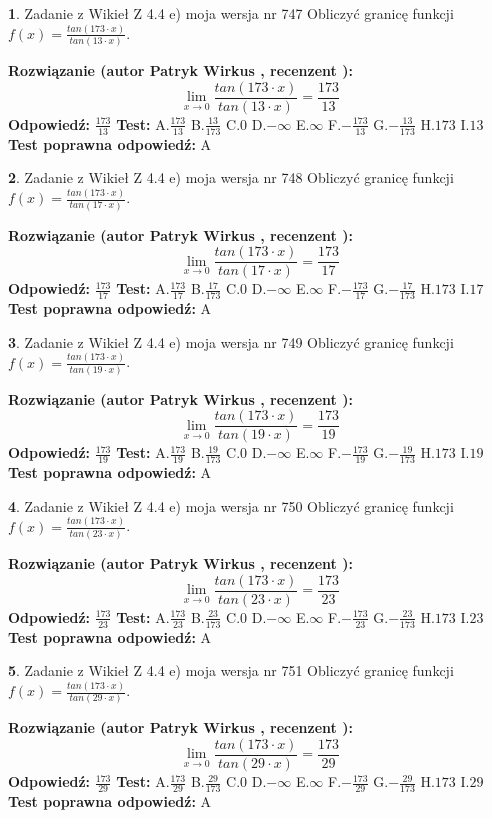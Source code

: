 \documentclass[12pt, a4paper]{article}
\theoremstyle{definition} %
\newtheorem{zad}{}
\newcommand{\zadStart}[1]{\begin{zad}#1\newline}
\newcommand{\zadStop}{\end{zad}}
\newcommand{\rozwStart}[2]{\noindent \textbf{Rozwiązanie (autor #1 , recenzent #2): }\newline}
\newcommand{\rozwStop}{\newline}
\newcommand{\odpStart}{\noindent \textbf{Odpowiedź:}\newline}
\newcommand{\odpStop}{\newline}
\newcommand{\testStart}{\noindent \textbf{Test:}\newline}
\newcommand{\testStop}{\newline}
\newcommand{\kluczStart}{\noindent \textbf{Test poprawna odpowiedź:}\newline}
\newcommand{\kluczStop}{\newline}
\begin{document}
\zadStart{Zadanie z Wikieł Z 4.4 e) moja wersja nr 747}
Obliczyć granicę funkcji $f(x)=\frac{tan(173\cdot x)}{tan(13\cdot x)}$.
\zadStop
\rozwStart{Patryk Wirkus}{}
$$\lim\limits_{x\to 0}\frac{tan(173\cdot x)}{tan(13\cdot x)}=
\frac{173}{13}$$
\rozwStop
\odpStart
$\frac{173}{13}$
\odpStop
\testStart
A.$\frac{173}{13}$
B.$\frac{13}{173}$
C.$0$
D.$-\infty$
E.$\infty$
F.$-\frac{173}{13}$
G.$-\frac{13}{173}$
H.$173$
I.$13$
\testStop
\kluczStart
A
\kluczStop



\zadStart{Zadanie z Wikieł Z 4.4 e) moja wersja nr 748}
Obliczyć granicę funkcji $f(x)=\frac{tan(173\cdot x)}{tan(17\cdot x)}$.
\zadStop
\rozwStart{Patryk Wirkus}{}
$$\lim\limits_{x\to 0}\frac{tan(173\cdot x)}{tan(17\cdot x)}=
\frac{173}{17}$$
\rozwStop
\odpStart
$\frac{173}{17}$
\odpStop
\testStart
A.$\frac{173}{17}$
B.$\frac{17}{173}$
C.$0$
D.$-\infty$
E.$\infty$
F.$-\frac{173}{17}$
G.$-\frac{17}{173}$
H.$173$
I.$17$
\testStop
\kluczStart
A
\kluczStop



\zadStart{Zadanie z Wikieł Z 4.4 e) moja wersja nr 749}
Obliczyć granicę funkcji $f(x)=\frac{tan(173\cdot x)}{tan(19\cdot x)}$.
\zadStop
\rozwStart{Patryk Wirkus}{}
$$\lim\limits_{x\to 0}\frac{tan(173\cdot x)}{tan(19\cdot x)}=
\frac{173}{19}$$
\rozwStop
\odpStart
$\frac{173}{19}$
\odpStop
\testStart
A.$\frac{173}{19}$
B.$\frac{19}{173}$
C.$0$
D.$-\infty$
E.$\infty$
F.$-\frac{173}{19}$
G.$-\frac{19}{173}$
H.$173$
I.$19$
\testStop
\kluczStart
A
\kluczStop



\zadStart{Zadanie z Wikieł Z 4.4 e) moja wersja nr 750}
Obliczyć granicę funkcji $f(x)=\frac{tan(173\cdot x)}{tan(23\cdot x)}$.
\zadStop
\rozwStart{Patryk Wirkus}{}
$$\lim\limits_{x\to 0}\frac{tan(173\cdot x)}{tan(23\cdot x)}=
\frac{173}{23}$$
\rozwStop
\odpStart
$\frac{173}{23}$
\odpStop
\testStart
A.$\frac{173}{23}$
B.$\frac{23}{173}$
C.$0$
D.$-\infty$
E.$\infty$
F.$-\frac{173}{23}$
G.$-\frac{23}{173}$
H.$173$
I.$23$
\testStop
\kluczStart
A
\kluczStop



\zadStart{Zadanie z Wikieł Z 4.4 e) moja wersja nr 751}
Obliczyć granicę funkcji $f(x)=\frac{tan(173\cdot x)}{tan(29\cdot x)}$.
\zadStop
\rozwStart{Patryk Wirkus}{}
$$\lim\limits_{x\to 0}\frac{tan(173\cdot x)}{tan(29\cdot x)}=
\frac{173}{29}$$
\rozwStop
\odpStart
$\frac{173}{29}$
\odpStop
\testStart
A.$\frac{173}{29}$
B.$\frac{29}{173}$
C.$0$
D.$-\infty$
E.$\infty$
F.$-\frac{173}{29}$
G.$-\frac{29}{173}$
H.$173$
I.$29$
\testStop
\kluczStart
A
\kluczStop
\end{document}
